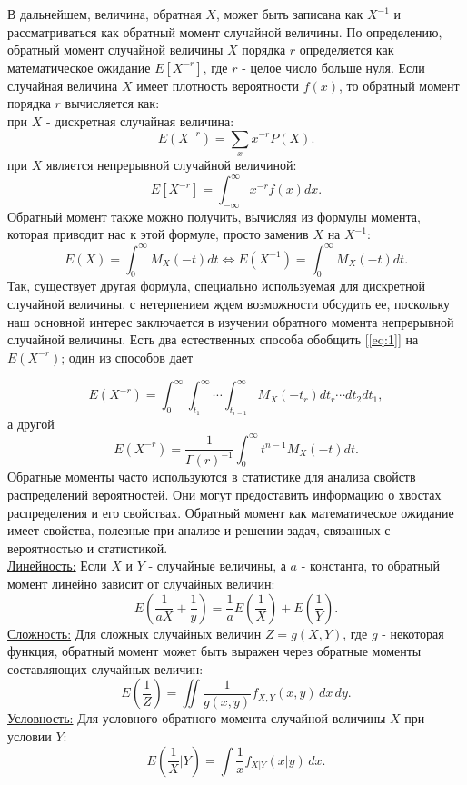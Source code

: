 \documentclass[13pt]{article}
\begin{document}
В дальнейшем, величина, обратная $X$, может быть записана как $X ^{-1}$ и рассматриваться как обратный момент случайной величины. По определению, обратный момент случайной величины \(X\) порядка \(r\) определяется как математическое ожидание \(E[X^{-r}]\), где \(r\) - целое число больше нуля. Если случайная величина \(X\) имеет плотность вероятности \(f(x)\), то обратный момент порядка \(r\) вычисляется как:\\
при $X$ - дискретная случайная величина:
\begin{equation*}
    E(X^{-r}) = \sum_{x}x^{-r}P(X).
\end{equation*}
при $X$ является непрерывной случайной величиной:
\begin{equation*}
    E[X^{-r}] = \int_{-\infty}^{\infty} x^{-r} f(x) dx.
\end{equation*}
Обратный момент также можно получить, вычисляя из формулы момента, которая приводит нас к этой формуле, просто заменив $X$ на $X^{-1}$:
\begin{equation}
\label{eq:1}
    E(X) = \int_{0}^{\infty} M_{X}(-t)dt \Longleftrightarrow E(X^{-1}) = \int_{0}^{\infty} M_{X}(-t)dt.
\end{equation}
Так, существует другая формула, специально используемая для дискретной случайной величины. с нетерпением ждем возможности обсудить ее, поскольку наш основной интерес заключается в изучении обратного момента непрерывной случайной величины. Есть два естественных способа обобщить [\ref{eq:1}] на $E(X^{-r})$; один из способов дает\par
\begin{equation}\label{(2)}
    E(X^{-r}) = \int_{0}^{\infty} \int_{t_1}^{\infty} \cdots \int_{t_{r-1}}^{\infty} M_{X}(-t_{r})dt_{r} \cdots dt_2dt_1,
\end{equation}
а другой 
\begin{equation}\label{(3)}
    E(X^{-r}) = \frac{1}{\Gamma(r)^{-1}}\int_{0}^{\infty} t^{n-1}M_{X}(-t)dt.
\end{equation}  
Обратные моменты часто используются в статистике для анализа свойств распределений вероятностей. Они могут предоставить информацию о хвостах распределения и его свойствах. Обратный момент как математическое ожидание имеет свойства, полезные при анализе и решении задач, связанных с вероятностью и статистикой.\\
\underline{Линейность:}
Если \( X \) и \( Y \) - случайные величины, а \( a \) - константа, то обратный момент линейно зависит от случайных величин: 
\[ E\left(\frac{1}{aX} + \frac{1}{y} \right) = \frac{1}{a}E\left(\frac{1}{X}\right) + E\left(\frac{1}{Y}\right). \]
\underline{Сложность:}
Для сложных случайных величин \( Z = g(X, Y) \), где \( g \) - некоторая функция, обратный момент может быть выражен через обратные моменты составляющих случайных величин:
\[ E\left(\frac{1}{Z}\right) = \iint \frac{1}{g(x,y)} f_{X,Y}(x,y) \,dx\,dy. \]
\underline{Условность:}
Для условного обратного момента случайной величины \( X \) при условии \( Y \):
\[ E\left(\frac{1}{X} | Y\right) = \int \frac{1}{x} f_{X|Y}(x|y) \,dx. \]
\end{document}

